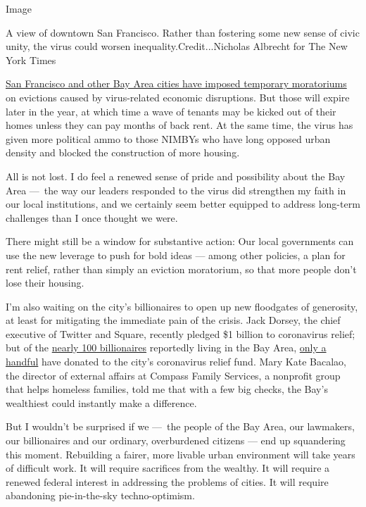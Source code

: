 Image

A view of downtown San Francisco. Rather than fostering some new sense
of civic unity, the virus could worsen inequality.Credit...Nicholas
Albrecht for The New York Times

\href{https://www.kqed.org/news/11809099/a-guide-to-bay-area-eviction-moratoriums-during-the-coronavirus-crisis}{San
Francisco and other Bay Area cities have imposed temporary moratoriums}
on evictions caused by virus-related economic disruptions. But those
will expire later in the year, at which time a wave of tenants may be
kicked out of their homes unless they can pay months of back rent. At
the same time, the virus has given more political ammo to those NIMBYs
who have long opposed urban density and blocked the construction of more
housing.

All is not lost. I do feel a renewed sense of pride and possibility
about the Bay Area ---~the way our leaders responded to the virus did
strengthen my faith in our local institutions, and we certainly seem
better equipped to address long-term challenges than I once thought we
were.

There might still be a window for substantive action: Our local
governments can use the new leverage to push for bold ideas --- among
other policies, a plan for rent relief, rather than simply an eviction
moratorium, so that more people don't lose their housing.

I'm also waiting on the city's billionaires to open up new floodgates of
generosity, at least for mitigating the immediate pain of the crisis.
Jack Dorsey, the chief executive of Twitter and Square, recently pledged
\$1 billion to coronavirus relief; but of the
\href{https://www.forbes.com/billionaires/\#2c1c274c251c}{nearly 100
billionaires} reportedly living in the Bay Area,
\href{https://sf.curbed.com/2020/4/30/21241539/sf-billionaires-donations-coronavirus-dorsey-benioff}{only
a handful} have donated to the city's coronavirus relief fund. Mary Kate
Bacalao, the director of external affairs at Compass Family Services, a
nonprofit group that helps homeless families, told me that with a few
big checks, the Bay's wealthiest could instantly make a difference.

But I wouldn't be surprised if we ---~the people of the Bay Area, our
lawmakers, our billionaires and our ordinary, overburdened citizens ---
end up squandering this moment. Rebuilding a fairer, more livable urban
environment will take years of difficult work. It will require
sacrifices from the wealthy. It will require a renewed federal interest
in addressing the problems of cities. It will require abandoning
pie-in-the-sky techno-optimism.


